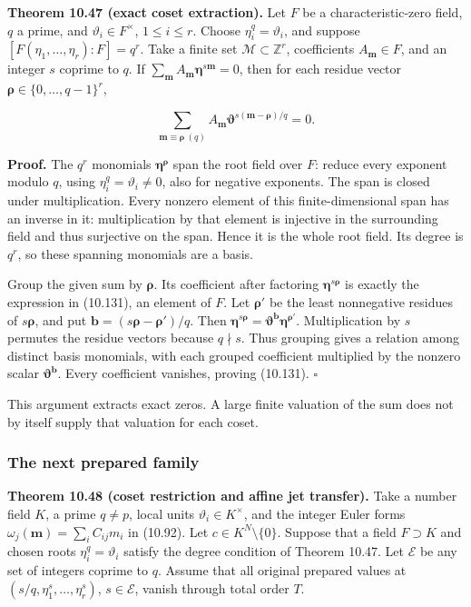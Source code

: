 \documentclass[
  11pt,
  a4paper,
]{article}
\begin{document}
\textbf{Theorem 10.47 (exact coset extraction).} Let \(F\) be a
characteristic-zero field, \(q\) a prime, and
\(\vartheta_i\in F^\times\), \(1\le i\le r\). Choose
\(\eta_i^q=\vartheta_i\), and suppose
\([F(\eta_1,\ldots,\eta_r):F]=q^r\). Take a finite set
\(\mathcal M\subset\mathbb Z^r\), coefficients
\(A_{\boldsymbol m}\in F\), and an integer \(s\) coprime to \(q\). If
\(\sum_{\boldsymbol m}A_{\boldsymbol m}\boldsymbol\eta^{s\boldsymbol m}=0\),
then for each residue vector \(\boldsymbol\rho\in\{0,\ldots,q-1\}^r\),

\[
\sum_{\boldsymbol m\equiv\boldsymbol\rho\ (q)}
A_{\boldsymbol m}\boldsymbol\vartheta^{s(\boldsymbol m-\boldsymbol\rho)/q}=0.
\tag{10.131}
\]

\textbf{Proof.} The \(q^r\) monomials
\(\boldsymbol\eta^{\boldsymbol\rho}\) span the root field over \(F\):
reduce every exponent modulo \(q\), using \(\eta_i^q=\vartheta_i\ne0\),
also for negative exponents. The span is closed under multiplication.
Every nonzero element of this finite-dimensional span has an inverse in
it: multiplication by that element is injective in the surrounding field
and thus surjective on the span. Hence it is the whole root field. Its
degree is \(q^r\), so these spanning monomials are a basis.

Group the given sum by \(\boldsymbol\rho\). Its coefficient after
factoring \(\boldsymbol\eta^{s\boldsymbol\rho}\) is exactly the
expression in (10.131), an element of \(F\). Let \(\boldsymbol\rho'\) be
the least nonnegative residues of \(s\boldsymbol\rho\), and put
\(\boldsymbol b=(s\boldsymbol\rho-\boldsymbol\rho')/q\). Then
\(\boldsymbol\eta^{s\boldsymbol\rho}=\boldsymbol\vartheta^{\boldsymbol b}\boldsymbol\eta^{\boldsymbol\rho'}\).
Multiplication by \(s\) permutes the residue vectors because
\(q\nmid s\). Thus grouping gives a relation among distinct basis
monomials, with each grouped coefficient multiplied by the nonzero
scalar \(\boldsymbol\vartheta^{\boldsymbol b}\). Every coefficient
vanishes, proving (10.131). \(\square\)

This argument extracts exact zeros. A large finite valuation of the sum
does not by itself supply that valuation for each coset.

\subsubsection{The next prepared family}\label{the-next-prepared-family}

\textbf{Theorem 10.48 (coset restriction and affine jet transfer).} Take
a number field \(K\), a prime \(q\ne p\), local units
\(\vartheta_i\in K^\times\), and the integer Euler forms
\(\omega_j(\boldsymbol m)=\sum_iC_{ij}m_i\) in (10.92). Let
\(c\in K^N\setminus\{0\}\). Suppose that a field \(F\supset K\) and
chosen roots \(\eta_i^q=\vartheta_i\) satisfy the degree condition of
Theorem 10.47. Let \(\mathcal E\) be any set of integers coprime to
\(q\). Assume that all original prepared values at
\((s/q,\eta_1^s,\ldots,\eta_r^s)\), \(s\in\mathcal E\), vanish through
total order \(T\).
\end{document}

